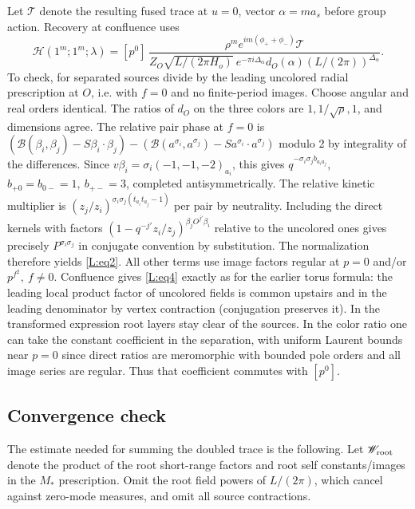 \documentclass[11pt]{article}
\numberwithin{equation}{section}
\theoremstyle{definition}\newtheorem{definition}[theorem]{Definition}
\theoremstyle{remark}\newtheorem{remark}[theorem]{Remark}
\begin{document}
Let \(\mathcal T\) denote the resulting fused trace at \(u=0\), vector \(\alpha=m a_s\) before group action. Recovery at confluence uses
\begin{equation}
 \mathcal H(1^m;1^m;\lambda)
  =[p^0]\,
 \frac{\rho^m e^{im(\phi_++\phi_-)}\mathcal T}
 {Z_O\sqrt{L/(2\pi H_o)}\ e^{-\pi i\Delta_\alpha}
 d_O(\alpha)(L/(2\pi))^{\Delta_\alpha}} .\label{L:eq4}
\end{equation}
To check, for separated sources divide by the leading uncolored radial prescription at \(O\), i.e. with \(f=0\) and no finite-period images. Choose angular and real orders identical. The ratios of \(d_O\) on the three colors are \(1,1/\sqrt\rho,1\), and dimensions agree. The relative pair phase at \(f=0\) is \((\mathcal B(\beta_i,\beta_j)-S\beta_i\cdot\beta_j)-(\mathcal B(a^{\sigma_i},a^{\sigma_j})-S a^{\sigma_i}\cdot a^{\sigma_j})\) modulo 2 by integrality of the differences. Since \(v\beta_i=\sigma_i(-1,-1,-2)_{a_i}\), this gives \(q^{-\sigma_i\sigma_j b_{a_i a_j}}\), \(b_{+0}=b_{0-}=1,\ b_{+-}=3\), completed antisymmetrically. The relative kinetic multiplier is \((z_j/z_i)^{\sigma_i\sigma_j(t_{a_i}t_{a_j}-1)}\) per pair by neutrality. Including the direct kernels with factors \((1-q^{-j'} z_i/z_j)^{\beta_j O^{j'}\beta_i}\) relative to the uncolored ones gives precisely \(P^{\sigma_i\sigma_j}\) in conjugate convention by substitution. The normalization therefore yields \eqref{L:eq2}. All other terms use image factors regular at \(p=0\) and/or \(p^{f^2},\ f\ne0\). Confluence gives \eqref{L:eq4} exactly as for the earlier torus formula: the leading local product factor of uncolored fields is common upstairs and in the leading denominator by vertex contraction (conjugation preserves it). In the transformed expression root layers stay clear of the sources. In the color ratio one can take the constant coefficient in the separation, with uniform Laurent bounds near \(p=0\) since direct ratios are meromorphic with bounded pole orders and all image series are regular. Thus that coefficient commutes with \([p^0]\).

\subsection{Convergence check}\label{L:step11}

The estimate needed for summing the doubled trace is the following.
Let $\mathscr W_{\rm root}$ denote the product of the root short-range
factors and root self constants/images in the $M_*$ prescription. Omit
the root field powers of $L/(2\pi)$, which cancel against zero-mode
measures, and omit all source contractions.
\end{document}
